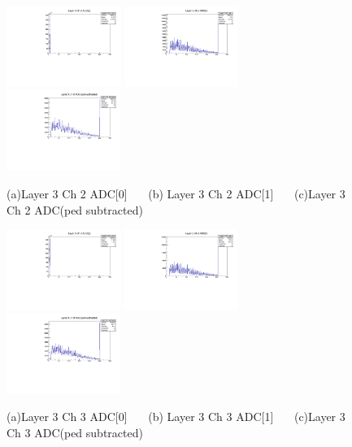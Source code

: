 \documentclass[a4paper,11pt]{article}
\theoremstyle{mytheor}
\begin{document}
\begin{figure}[H] 
\vspace*{-0.3cm} 
\includegraphics[width=0.33\textwidth,scale=0.5,trim=0 0 0 0,clip]{plotsdir/file0_test-Layer3_Ch2_adc0-1.pdf} 
\includegraphics[width=0.33\textwidth,scale=0.5,trim=0 0 0 0,clip]{plotsdir/file0_test-Layer3_Ch2_adc1-1.pdf} 
\includegraphics[width=0.33\textwidth,scale=0.5,trim=0 0 0 0,clip]{plotsdir/file0_test-Layer3_Ch2_adcPedsub-1.pdf} 
\caption{(a)Layer 3 Ch 2 ADC[0] ~~~(b) Layer 3 Ch 2 ADC[1] ~~~(c)Layer 3 Ch 2 ADC(ped subtracted) } 
\end{figure} 
\begin{figure}[H] 
\vspace*{-0.3cm} 
\includegraphics[width=0.33\textwidth,scale=0.5,trim=0 0 0 0,clip]{plotsdir/file0_test-Layer3_Ch3_adc0-1.pdf} 
\includegraphics[width=0.33\textwidth,scale=0.5,trim=0 0 0 0,clip]{plotsdir/file0_test-Layer3_Ch3_adc1-1.pdf} 
\includegraphics[width=0.33\textwidth,scale=0.5,trim=0 0 0 0,clip]{plotsdir/file0_test-Layer3_Ch3_adcPedsub-1.pdf} 
\caption{(a)Layer 3 Ch 3 ADC[0] ~~~(b) Layer 3 Ch 3 ADC[1] ~~~(c)Layer 3 Ch 3 ADC(ped subtracted) } 
\end{figure} 
\end{document}
